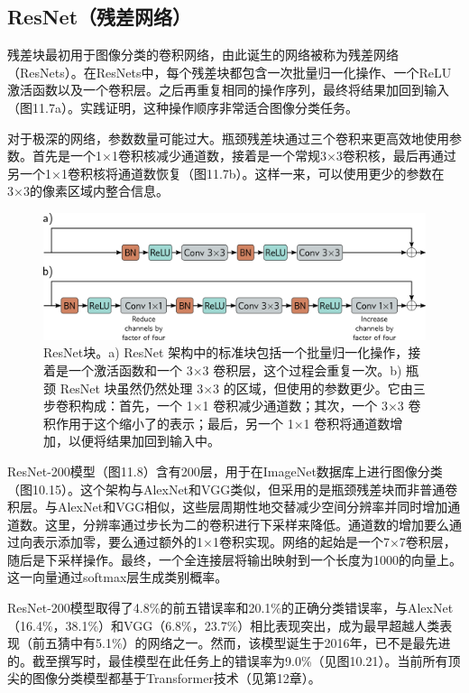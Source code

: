 \subsection{ResNet（残差网络）}
残差块最初用于图像分类的卷积网络，由此诞生的网络被称为残差网络（ResNets）。在ResNets中，每个残差块都包含一次批量归一化操作、一个ReLU激活函数以及一个卷积层。之后再重复相同的操作序列，最终将结果加回到输入（图11.7a）。实践证明，这种操作顺序非常适合图像分类任务。

对于极深的网络，参数数量可能过大。瓶颈残差块通过三个卷积来更高效地使用参数。首先是一个1×1卷积核减少通道数，接着是一个常规3×3卷积核，最后再通过另一个1×1卷积核将通道数恢复（图11.7b）。这样一来，可以使用更少的参数在3×3的像素区域内整合信息。

\begin{figure}[ht!]
\centering
\includegraphics[width=0.7\linewidth]{png/chapter11/ResidualResNet1.png}
\caption{ResNet块。a) ResNet 架构中的标准块包括一个批量归一化操作，接着是一个激活函数和一个 3×3 卷积层，这个过程会重复一次。b) 瓶颈 ResNet 块虽然仍然处理 3×3 的区域，但使用的参数更少。它由三步卷积构成：首先，一个 1×1 卷积减少通道数；其次，一个 3×3 卷积作用于这个缩小了的表示；最后，另一个 1×1 卷积将通道数增加，以便将结果加回到输入中。}
\end{figure}


ResNet-200模型（图11.8）含有200层，用于在ImageNet数据库上进行图像分类（图10.15）。这个架构与AlexNet和VGG类似，但采用的是瓶颈残差块而非普通卷积层。与AlexNet和VGG相似，这些层周期性地交替减少空间分辨率并同时增加通道数。这里，分辨率通过步长为二的卷积进行下采样来降低。通道数的增加要么通过向表示添加零，要么通过额外的1×1卷积实现。网络的起始是一个7×7卷积层，随后是下采样操作。最终，一个全连接层将输出映射到一个长度为1000的向量上。这一向量通过softmax层生成类别概率。

ResNet-200模型取得了4.8\%的前五错误率和20.1\%的正确分类错误率，与AlexNet（16.4\%，38.1\%）和VGG（6.8\%，23.7\%）相比表现突出，成为最早超越人类表现（前五猜中有5.1\%）的网络之一。然而，该模型诞生于2016年，已不是最先进的。截至撰写时，最佳模型在此任务上的错误率为9.0\%（见图10.21）。当前所有顶尖的图像分类模型都基于Transformer技术（见第12章）。

